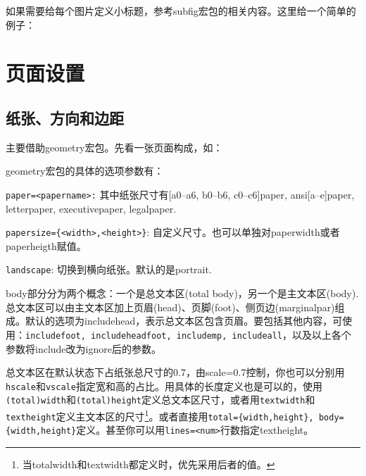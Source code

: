 {如果需要给每个图片定义小标题，参考subfig宏包的相关内容。这里给一个简单的例子：
\begin{latex}{}
\begin{figure}
\centering
\subfloat[...]{\label{sub-fig-1}
  \begin{minipage}
  \centering
  \texttt{[image: ...]}
  \end{minipage}}
\quad\subfloat[...]
\end{latex}

\section{页面设置}

\subsection{纸张、方向和边距}
主要借助geometry宏包。先看一张页面构成，如：
\begin{figure}
\centering

\label{fig:geo-paper}
\end{figure}

geometry宏包的具体的选项参数有：
\begin{feai}
\item \texttt{paper=<papername>:} 其中纸张尺寸有[a0--a6, b0--b6, c0--c6]paper, ansi[a--e]paper, letterpaper, executivepaper, legalpaper.
\item \texttt{papersize=\{<width>,<height>\}}: 自定义尺寸。也可以单独对paperwidth或者paperheigth赋值。
\item \texttt{landscape}: 切换到横向纸张。默认的是portrait.
\end{feai}

body部分分为两个概念：一个是总文本区(total body)，另一个是主文本区(body). 总文本区可以由主文本区加上页眉(head)、页脚(foot)、侧页边(marginalpar)组成。默认的选项为includehead，表示总文本区包含页眉。要包括其他内容，可使用：\texttt{includefoot, includeheadfoot, includemp, includeall}，以及以上各个参数将include改为ignore后的参数。

总文本区在默认状态下占纸张总尺寸的0.7，由scale=0.7控制，你也可以分别用\texttt{hscale}和\texttt{vscale}指定宽和高的占比。用具体的长度定义也是可以的，使用\texttt{(total)width}和\texttt{(total)height}定义总文本区尺寸，或者用\texttt{textwidth}和\texttt{textheight}定义主文本区的尺寸\footnote{当totalwidth和textwidth都定义时，优先采用后者的值。}。或者直接用\texttt{total=\{width,height\}, body=\{width,height\}}定义。甚至你可以用\texttt{lines=<num>}行数指定textheight。

}
